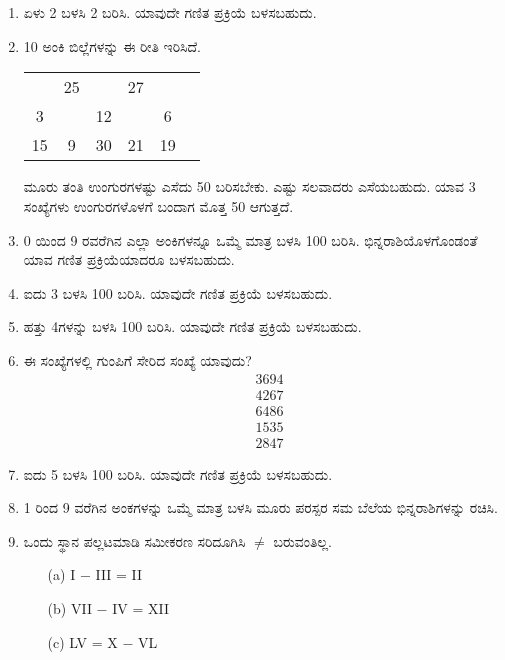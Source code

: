 \chapter{}\label{chap9}

\begin{enumerate}
\renewcommand{\labelenumi}{\bf\theenumi.}
\itemsep=5pt

\item ಏಳು 2 ಬಳಸಿ 2 ಬರಿಸಿ. ಯಾವುದೇ ಗಣಿತ ಪ್ರಕ್ರಿಯೆ ಬಳಸಬಹುದು. 

\item 10 ಅಂಕಿ ಬಿಲ್ಲೆಗಳನ್ನು ಈ ರೀತಿ ಇರಿಸಿದೆ. 

\begin{tabular}[t]{c@{\;}c@{\;}c@{\;}c@{\;}c@{\;}c}
& 25 & & 27 & & \\
3 & & 12 & & 6 & \\
15 & 9 & 30 & 21 & 19
\end{tabular}

ಮೂರು ತಂತಿ ಉಂಗುರಗಳಷ್ಟು ಎಸೆದು 50 ಬರಿಸಬೇಕು. ಎಷ್ಟು ಸಲವಾದರು ಎಸೆಯಬಹುದು. ಯಾವ 3 ಸಂಖ್ಯೆಗಳು ಉಂಗುರಗಳೊಳಗೆ ಬಂದಾಗ ಮೊತ್ತ 50 ಆಗುತ್ತದೆ. 

\item 0 ಯಿಂದ 9 ರವರೆಗಿನ ಎಲ್ಲಾ ಅಂಕಿಗಳನ್ನೂ ಒಮ್ಮೆ ಮಾತ್ರ ಬಳಸಿ 100 ಬರಿಸಿ. ಭಿನ್ನರಾಶಿಯೊಳಗೊಂಡಂತೆ ಯಾವ ಗಣಿತ ಪ್ರಕ್ರಿಯೆಯಾದರೂ ಬಳಸಬಹುದು. 

\item ಐದು 3 ಬಳಸಿ 100 ಬರಿಸಿ. ಯಾವುದೇ ಗಣಿತ ಪ್ರಕ್ರಿಯೆ ಬಳಸಬಹುದು. 

\item ಹತ್ತು 4ಗಳನ್ನು ಬಳಸಿ 100 ಬರಿಸಿ. ಯಾವುದೇ ಗಣಿತ ಪ್ರಕ್ರಿಯೆ ಬಳಸಬಹುದು. 

\item ಈ ಸಂಖ್ಯೆಗಳಲ್ಲಿ ಗುಂಪಿಗೆ ಸೇರಿದ ಸಂಖ್ಯೆ ಯಾವುದು? 
\begin{align*}
& 3694\\
& 4267\\
& 6486\\
& 1535\\
& 2847
\end{align*}

\item ಐದು 5 ಬಳಸಿ 100 ಬರಿಸಿ. ಯಾವುದೇ ಗಣಿತ ಪ್ರಕ್ರಿಯೆ ಬಳಸಬಹುದು. 

\item 1 ರಿಂದ 9 ವರೆಗಿನ ಅಂಕಗಳನ್ನು ಒಮ್ಮೆ ಮಾತ್ರ ಬಳಸಿ ಮೂರು ಪರಸ್ಪರ ಸಮ ಬೆಲೆಯ ಭಿನ್ನರಾಶಿಗಳನ್ನು ರಚಿಸಿ. 

\item ಒಂದು ಸ್ಥಾನ ಪಲ್ಲಟಮಾಡಿ ಸಮೀಕರಣ ಸರಿದೂಗಿಸಿ $\neq$ ಬರುವಂತಿಲ್ಲ. 
\begin{itemize}
\item[(a)] I $-$ III = II
\item[(b)] VII $-$ IV = XII
\item[(c)] LV = X $-$ VL
\end{itemize}


\end{enumerate}

